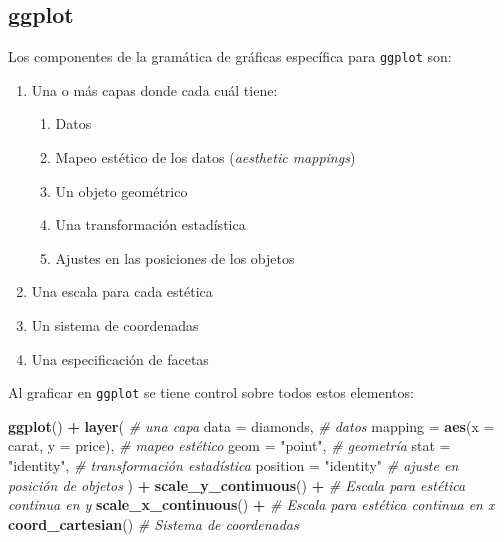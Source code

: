 \documentclass[]{article}
\newenvironment{Shaded}{\begin{snugshade}}{\end{snugshade}}
\newcommand{\KeywordTok}[1]{\textcolor[rgb]{0.13,0.29,0.53}{\textbf{#1}}}
\newcommand{\DataTypeTok}[1]{\textcolor[rgb]{0.13,0.29,0.53}{#1}}
\newcommand{\StringTok}[1]{\textcolor[rgb]{0.31,0.60,0.02}{#1}}
\newcommand{\CommentTok}[1]{\textcolor[rgb]{0.56,0.35,0.01}{\textit{#1}}}
\newcommand{\OperatorTok}[1]{\textcolor[rgb]{0.81,0.36,0.00}{\textbf{#1}}}
\newcommand{\NormalTok}[1]{#1}
\providecommand{\tightlist}{%
  \setlength{\itemsep}{0pt}\setlength{\parskip}{0pt}}
\begin{document}
\subsection{ggplot}\label{ggplot}

Los componentes de la gramática de gráficas específica para
\texttt{ggplot} son:

\begin{enumerate}
\def\labelenumi{\arabic{enumi}.}
\tightlist
\item
  Una o más capas donde cada cuál tiene:

  \begin{enumerate}
  \def\labelenumii{\alph{enumii}.}
  \tightlist
  \item
    Datos
  \item
    Mapeo estético de los datos (\emph{aesthetic mappings})
  \item
    Un objeto geométrico
  \item
    Una transformación estadística
  \item
    Ajustes en las posiciones de los objetos
  \end{enumerate}
\item
  Una escala para cada estética
\item
  Un sistema de coordenadas
\item
  Una especificación de facetas
\end{enumerate}

Al graficar en \texttt{ggplot} se tiene control sobre todos estos
elementos:

\begin{Shaded}
\begin{Highlighting}[]
\KeywordTok{ggplot}\NormalTok{() }\OperatorTok{+}
\StringTok{  }\KeywordTok{layer}\NormalTok{( }\CommentTok{# una capa}
    \DataTypeTok{data =}\NormalTok{ diamonds, }\CommentTok{# datos}
    \DataTypeTok{mapping =} \KeywordTok{aes}\NormalTok{(}\DataTypeTok{x =}\NormalTok{ carat, }\DataTypeTok{y =}\NormalTok{ price), }\CommentTok{# mapeo estético}
    \DataTypeTok{geom =} \StringTok{"point"}\NormalTok{, }\CommentTok{# geometría}
    \DataTypeTok{stat =} \StringTok{"identity"}\NormalTok{, }\CommentTok{# transformación estadística}
    \DataTypeTok{position =} \StringTok{"identity"} \CommentTok{# ajuste en posición de objetos}
\NormalTok{    ) }\OperatorTok{+}\StringTok{ }
\StringTok{  }\KeywordTok{scale_y_continuous}\NormalTok{() }\OperatorTok{+}\StringTok{ }\CommentTok{# Escala para estética continua en y}
\StringTok{  }\KeywordTok{scale_x_continuous}\NormalTok{() }\OperatorTok{+}\StringTok{ }\CommentTok{# Escala para estética continua en x}
\StringTok{  }\KeywordTok{coord_cartesian}\NormalTok{() }\CommentTok{# Sistema de coordenadas}
\end{Highlighting}
\end{Shaded}
\end{document}
